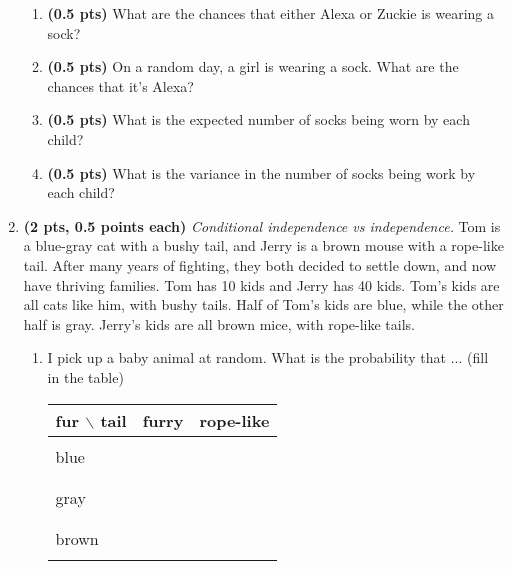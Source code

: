 \documentclass{article}
\newcommand{\showpoints}[1]{\textbf{(#1)}}
\begin{document}
\begin{enumerate}
\begin{enumerate}


\item \showpoints{0.5 pts}
What are the chances that either Alexa or Zuckie is wearing a sock?


\item \showpoints{0.5 pts}
On a random day, a girl is wearing a sock. What are the chances that it's Alexa?


\item \showpoints{0.5 pts}
What is the expected number of socks being worn by each child?


\item \showpoints{0.5 pts} What is the variance in the number of socks being work by each child?





\end{enumerate}




\item \showpoints{2 pts, 0.5 points each} \emph{Conditional independence vs independence.} 
Tom is a blue-gray cat with a bushy tail, and Jerry is a brown mouse with a rope-like tail. After many years of fighting, they both decided to settle down, and now have thriving families. Tom has 10 kids and Jerry has 40 kids. Tom's kids are all  cats like him, with bushy tails. Half of Tom's kids are blue, while the other half is gray. Jerry's kids are all brown mice, with rope-like tails.

\begin{enumerate}
\item 
I pick up a baby animal at random.  What is the probability that ... (fill in the table)
\begin{center}
\begin{tabular}{|l|ll|}
\hline
fur $\backslash$ tail & furry & rope-like\\\hline
&&\\blue&&\\&&\\
&&\\gray&&\\&&\\
&&\\brown&&\\&&\\
\hline
\end{tabular}
\end{center}





\end{enumerate}
\end{enumerate}
\end{document}
